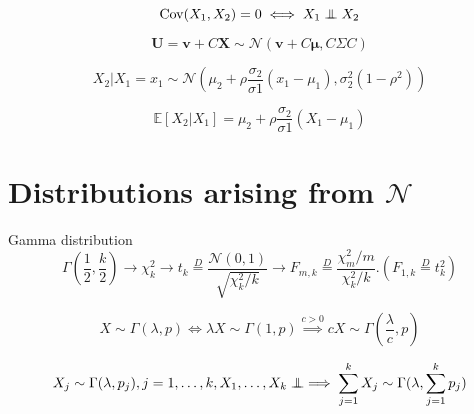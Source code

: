 \documentclass[twocolumn]{amsart}
\newcommand{\E}{\mathbb{E}}
\newcommand{\Cov}{\operatorname{Cov}}
\newcommand\independent{\protect\mathpalette{\protect\independenT}{\perp}}
\def\independenT#1#2{\mathrel{\rlap{$#1#2$}\mkern3mu{#1#2}}}
\begin{document}

\begin{equation*}
  \Cov(X_{1},X_{2}) = 0 \iff X_{1} \independent X_{2}
\end{equation*}

\begin{equation*}
  \boldsymbol{U} = \boldsymbol{v} + C\boldsymbol{X} \sim
  \mathcal{N}(\boldsymbol{v} + C\boldsymbol{\mu},C\Sigma C)
\end{equation*}

\begin{equation*}
  X_{2} | X_{1} = x_{1} \sim \mathcal{N}(\mu_{2} + \rho
  \frac{\sigma_{2}}{\sigma{1}}(x_{1} - \mu_{1}),\sigma_{2}^{2}(1-\rho^{2}))
\end{equation*}

\begin{equation*}
  \E[X_{2} | X_{1}] = \mu_{2} + \rho \frac{\sigma_{2}}{\sigma{1}}(X_{1} - \mu_{1})
\end{equation*}


\section*{Distributions arising from $\mathcal{N}$}
Gamma distribution
\begin{equation*}
  \Gamma\left(\frac{1}{2},\frac{k}{2}\right) \rightarrow \chi_{k}^{2}
  \rightarrow t_{k} \stackrel{D}{=}
  \frac{\mathcal{N}(0,1)}{\sqrt{\chi_{k}^{2}/k}} \rightarrow F_{m,k}
  \stackrel{D}{=} \frac{\chi_{m}^{2}/m}{\chi_{k}^{2}/k}.
  (F_{1,k} \stackrel{D}{=} t_{k}^{2})
\end{equation*}

\begin{equation*}
  X\sim\Gamma(\lambda,p) \iff \lambda X \sim \Gamma(1,p)
  \stackrel{c>0}{\implies} cX\sim \Gamma(\frac{\lambda}{c},p)
\end{equation*}

\begin{equation*}
  X_{j}\sim \Gamma(\lambda, p_{j}), j=1,\ldots,k, X_{1},\ldots,X_{k}
  \independent \implies \sum_{j=1}^{k}X_{j} \sim \Gamma(\lambda, \sum_{j=1}^{k}p_{j})
\end{equation*}
\end{document}
